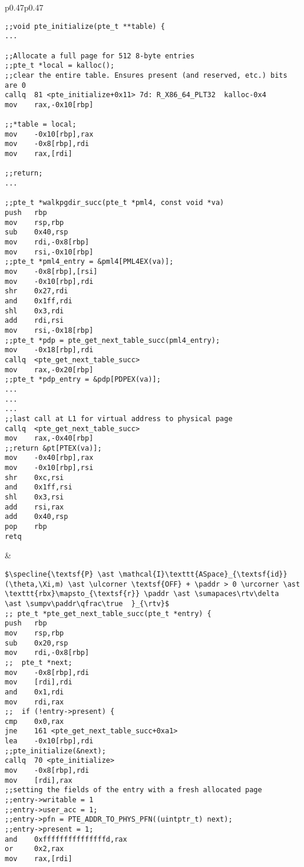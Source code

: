 \begin{figure*}[ht]
\begin{tabular}{p{}p{}}
  \begin{lstlisting}[mathescape,basicstyle=\scriptsize\ttfamily]
;;void pte_initialize(pte_t **table) {
...
     
;;Allocate a full page for 512 8-byte entries
;;pte_t *local = kalloc();
;;clear the entire table. Ensures present (and reserved, etc.) bits are 0
callq  81 <pte_initialize+0x11>	7d: R_X86_64_PLT32	kalloc-0x4
mov    rax,-0x10[rbp]
   
;;*table = local;
mov    -0x10[rbp],rax
mov    -0x8[rbp],rdi
mov    rax,[rdi]

;;return;
...

;;pte_t *walkpgdir_succ(pte_t *pml4, const void *va) 
push   rbp
mov    rsp,rbp
sub    0x40,rsp
mov    rdi,-0x8[rbp]
mov    rsi,-0x10[rbp]
;;pte_t *pml4_entry = &pml4[PML4EX(va)];
mov    -0x8[rbp],[rsi]
mov    -0x10[rbp],rdi
shr    0x27,rdi
and    0x1ff,rdi
shl    0x3,rdi
add    rdi,rsi
mov    rsi,-0x18[rbp]
;;pte_t *pdp = pte_get_next_table_succ(pml4_entry);
mov    -0x18[rbp],rdi
callq  <pte_get_next_table_succ>
mov    rax,-0x20[rbp]
;;pte_t *pdp_entry = &pdp[PDPEX(va)];
...
...
...
;;last call at L1 for virtual address to physical page 
callq  <pte_get_next_table_succ>
mov    rax,-0x40[rbp]
;;return &pt[PTEX(va)];
mov    -0x40[rbp],rax
mov    -0x10[rbp],rsi
shr    0xc,rsi
and    0x1ff,rsi
shl    0x3,rsi
add    rsi,rax
add    0x40,rsp
pop    rbp
retq   
  \end{lstlisting}&
  \begin{lstlisting}[mathescape,basicstyle=\scriptsize\ttfamily]
   $\specline{\textsf{P} \ast \mathcal{I}\texttt{ASpace}_{\textsf{id}}(\theta,\Xi,m) \ast \ulcorner \textsf{OFF} + \paddr > 0 \urcorner \ast \texttt{rbx}\mapsto_{\textsf{r}} \paddr \ast \sumapaces\rtv\delta  \ast \sumpv\paddr\qfrac\true  }_{\rtv}$
;; pte_t *pte_get_next_table_succ(pte_t *entry) {
push   rbp
mov    rsp,rbp
sub    0x20,rsp
mov    rdi,-0x8[rbp]
;;  pte_t *next;
mov    -0x8[rbp],rdi
mov    [rdi],rdi
and    0x1,rdi
mov    rdi,rax
;;  if (!entry->present) {
cmp    0x0,rax
jne    161 <pte_get_next_table_succ+0xa1>
lea    -0x10[rbp],rdi
;;pte_initialize(&next);
callq  70 <pte_initialize>
mov    -0x8[rbp],rdi
mov    [rdi],rax
;;setting the fields of the entry with a fresh allocated page
;;entry->writable = 1
;;entry->user_acc = 1;
;;entry->pfn = PTE_ADDR_TO_PHYS_PFN((uintptr_t) next);
;;entry->present = 1;
and    0xfffffffffffffffd,rax
or     0x2,rax
mov    rax,[rdi]

\end{lstlisting}
\end{tabular}
\end{figure*}
